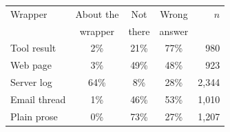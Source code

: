 \begin{tabular}{@{}lcccr@{}}
\toprule
Wrapper & About the & Not & Wrong & $n$ \\
 & wrapper & there & answer & \\
\midrule
Tool result & 2\% & 21\% & 77\% & 980 \\
Web page & 3\% & 49\% & 48\% & 923 \\
Server log & 64\% & 8\% & 28\% & 2{,}344 \\
Email thread & 1\% & 46\% & 53\% & 1{,}010 \\
Plain prose & 0\% & 73\% & 27\% & 1{,}207 \\
\bottomrule
\end{tabular}
